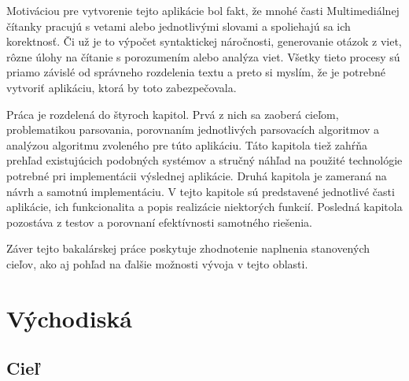 \documentclass[12pt,a4paper]{report}
\theoremstyle{definition}
\theoremstyle{remark}
\begin{document}
Motiváciou pre vytvorenie tejto aplikácie bol fakt, že mnohé časti Multimediálnej čítanky pracujú s vetami alebo jednotlivými slovami a spoliehajú sa ich korektnosť. Či už je to výpočet syntaktickej náročnosti, generovanie otázok z viet,  rôzne úlohy na čítanie s porozumením alebo analýza viet. Všetky tieto procesy sú priamo závislé od správneho rozdelenia textu a preto si myslím, že je potrebné vytvoriť aplikáciu, ktorá by toto zabezpečovala.



Práca je rozdelená do štyroch kapitol. Prvá z nich sa zaoberá cieľom, problematikou parsovania, porovnaním jednotlivých parsovacích algoritmov a analýzou algoritmu zvoleného pre túto aplikáciu. Táto kapitola tiež zahŕňa prehľad existujúcich podobných systémov a stručný náhľad na použité technológie potrebné pri implementácii výslednej aplikácie. Druhá kapitola je zameraná na návrh a samotnú implementáciu. V tejto kapitole sú predstavené jednotlivé časti aplikácie, ich funkcionalita a popis realizácie niektorých funkcií. Posledná kapitola pozostáva z testov a porovnaní  efektívnosti samotného riešenia.


Záver tejto bakalárskej práce poskytuje zhodnotenie naplnenia stanovených cieľov, ako aj pohľad na ďalšie možnosti vývoja v tejto oblasti.

\chapter{Východiská}
\section{Cieľ}
\end{document}
